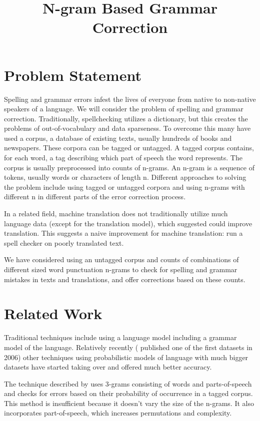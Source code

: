 \documentclass[twocolumn]{article}
\title{ N-gram Based Grammar Correction}
\date{}
\begin{document}
%
%


\maketitle
\section{Problem Statement}
Spelling and grammar errors infest the lives of everyone from native to non-native speakers of a language. We will consider the problem of spelling and grammar correction. Traditionally, spellchecking utilizes a dictionary, but this creates the problems of out-of-vocabulary and data sparseness. To overcome this many have used a corpus, a database of existing texts, usually hundreds of books and newspapers. These corpora can be tagged or untagged. A tagged corpus contains, for each word, a tag describing which part of speech the word represents. The corpus is usually preprocessed into counts of n-grams. An n-gram is a sequence of tokens, usually words or characters of length n. Different approaches to solving the problem include using tagged or untagged corpora and using n-grams with different n in different parts of the error correction process.

In a related field, machine translation does not traditionally utilize much language data (except for the translation model), which \cite{norvig09} suggested could improve translation. This suggests a naive improvement for machine translation: run a spell checker on poorly translated text.

We have considered using an untagged corpus and counts of combinations of different sized word punctuation n-grams to check for spelling and grammar mistakes in texts and translations, and offer corrections based on these counts.

\section{Related Work}
Traditional techniques include using a language model including a grammar model of the language. Relatively recently (\cite{michel11} published one of the first datasets in 2006) other techniques using probabilistic models of language with much bigger datasets have started taking over and offered much better accuracy.

The technique described by \cite{Fossati07} uses 3-grams consisting of words and parts-of-speech and checks for errors based on their probability of occurrence in a tagged corpus. This method is insufficient because it doesn’t vary the size of the n-grams. It also incorporates part-of-speech, which increases permutations and complexity.
\end{document}
